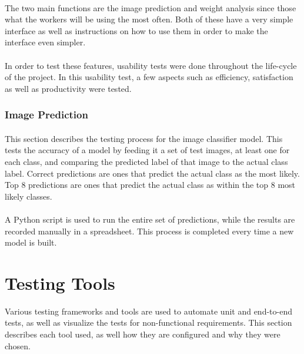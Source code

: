 \documentclass[a4paper, 11pt]{article}
\begin{document}
            \paragraph{}
            The two main functions are the image prediction and weight analysis since those what the workers will be using the most often. Both of these have a very simple interface as well as instructions on how to use them in order to make the interface even simpler.
            \paragraph{}
            In order to test these features, usability tests were done throughout the life-cycle of the project. In this usability test, a few aspects such as efficiency, satisfaction as well as productivity were tested.
            
        \subsubsection{Image Prediction}
            \paragraph{}
            This section describes the testing process for the image classifier model. This tests the accuracy of a model by feeding it a set of test images, at least one for each class, and comparing the predicted label of that image to the actual class label. Correct predictions are ones that predict the actual class as the most likely. Top 8 predictions are ones that predict the actual class as within the top 8 most likely classes.
            \paragraph{}
            A Python script is used to run the entire set of predictions, while the results are recorded manually in a spreadsheet. This process is completed every time a new model is built.

\section{Testing Tools}
Various testing frameworks and tools are used to automate unit and end-to-end tests, as well as visualize the tests for non-functional requirements. This section describes each tool used, as well how they are configured and why they were chosen.
\end{document}
